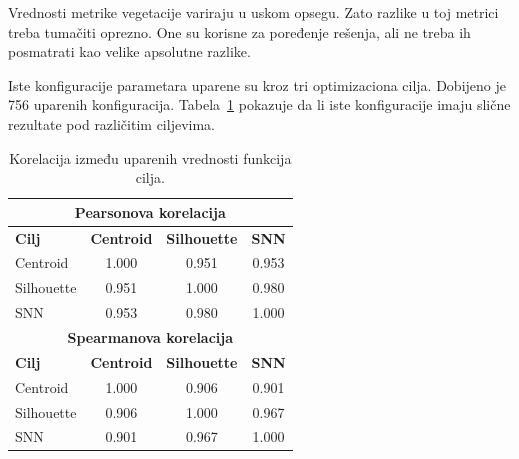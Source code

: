 \documentclass[11pt]{article}
\begin{document}
\begin{table}[ht]
\centering
\caption{Sažetak glavnog eksperimenta za SNN funkciju cilja.}
\label{tab:stage1_snn_fitness_summary}
\end{table}

Vrednosti metrike vegetacije variraju u uskom opsegu. Zato razlike u toj metrici treba tumačiti oprezno. One su korisne za poređenje rešenja, ali ne treba ih posmatrati kao velike apsolutne razlike.

Iste konfiguracije parametara uparene su kroz tri optimizaciona cilja. Dobijeno je 756 uparenih konfiguracija. Tabela~\ref{tab:stage1_fitness_objective_correlation} pokazuje da li iste konfiguracije imaju slične rezultate pod različitim ciljevima.

\begin{table}[ht]
\centering
\caption{Korelacija između uparenih vrednosti funkcija cilja.}
\label{tab:stage1_fitness_objective_correlation}
\begin{tabular}{lccc}
\hline
\multicolumn{4}{c}{\textbf{Pearsonova korelacija}} \\
\hline
\textbf{Cilj} & \textbf{Centroid} & \textbf{Silhouette} & \textbf{SNN} \\
\hline
Centroid & 1.000 & 0.951 & 0.953 \\
Silhouette & 0.951 & 1.000 & 0.980 \\
SNN & 0.953 & 0.980 & 1.000 \\
\hline
\multicolumn{4}{c}{\textbf{Spearmanova korelacija}} \\
\hline
\textbf{Cilj} & \textbf{Centroid} & \textbf{Silhouette} & \textbf{SNN} \\
\hline
Centroid & 1.000 & 0.906 & 0.901 \\
Silhouette & 0.906 & 1.000 & 0.967 \\
SNN & 0.901 & 0.967 & 1.000 \\
\hline
\end{tabular}
\end{table}
\end{document}
